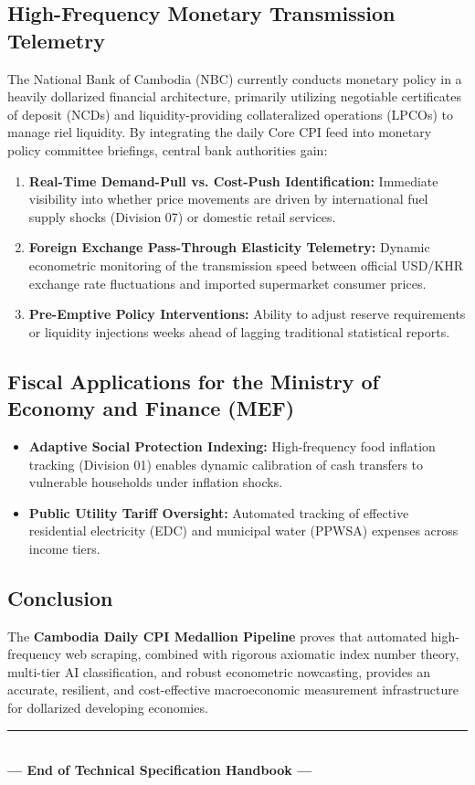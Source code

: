 \documentclass[11pt,a4paper]{article}
\begin{document}
\subsection{High-Frequency Monetary Transmission Telemetry}
The National Bank of Cambodia (NBC) currently conducts monetary policy in a heavily dollarized financial architecture, primarily utilizing negotiable certificates of deposit (NCDs) and liquidity-providing collateralized operations (LPCOs) to manage riel liquidity. By integrating the daily Core CPI feed into monetary policy committee briefings, central bank authorities gain:
\begin{enumerate}
    \item \textbf{Real-Time Demand-Pull vs. Cost-Push Identification:} Immediate visibility into whether price movements are driven by international fuel supply shocks (Division 07) or domestic retail services.
    \item \textbf{Foreign Exchange Pass-Through Elasticity Telemetry:} Dynamic econometric monitoring of the transmission speed between official USD/KHR exchange rate fluctuations and imported supermarket consumer prices.
    \item \textbf{Pre-Emptive Policy Interventions:} Ability to adjust reserve requirements or liquidity injections weeks ahead of lagging traditional statistical reports.
\end{enumerate}

\subsection{Fiscal Applications for the Ministry of Economy and Finance (MEF)}
\begin{itemize}[noitemsep]
    \item \textbf{Adaptive Social Protection Indexing:} High-frequency food inflation tracking (Division 01) enables dynamic calibration of cash transfers to vulnerable households under inflation shocks.
    \item \textbf{Public Utility Tariff Oversight:} Automated tracking of effective residential electricity (EDC) and municipal water (PPWSA) expenses across income tiers.
\end{itemize}

\subsection{Conclusion}
The \textbf{Cambodia Daily CPI Medallion Pipeline} proves that automated high-frequency web scraping, combined with rigorous axiomatic index number theory, multi-tier AI classification, and robust econometric nowcasting, provides an accurate, resilient, and cost-effective macroeconomic measurement infrastructure for dollarized developing economies.

\vspace{1.5cm}
\begin{center}
\rule{0.6\textwidth}{0.4pt}\\
\vspace{0.4cm}
\textbf{--- End of Technical Specification Handbook ---}
\end{center}
\end{document}
